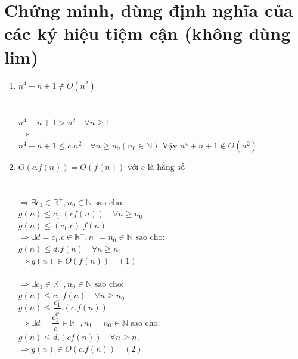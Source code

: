 \documentclass[12pt, letterpaper]{article}
\begin{document}
\section{Chứng minh, dùng định nghĩa của các ký hiệu tiệm cận (không dùng lim)}
\begin{enumerate}[label=\bfseries\large\alph*.]
    \item $n^4 + n + 1 \notin O(n^2)$ \\ \\
     \\
    $n^4 + n + 1 > n^2 \quad \forall n \geq 1$ \\
    $\Rightarrow$  \\
    $n^4 + n + 1 \leq c.n^2 \quad \forall n \geq n_0 (n_0 \in \mathbb{N})$
    $\text{Vậy } n^4 + n + 1 \notin O(n^2)$

    \item $O(c.f(n)) = O(f(n)) \text{ với c là hằng số}$ \\ \\
     \\
    $\Rightarrow \exists c_1 \in \mathbb{R^+}, n_0 \in \mathbb{N} \text{ sao cho:}$ \\
    $g(n) \leq c_1.(cf(n)) \quad \forall n \geq n_0$ \\
    $g(n) \leq (c_1.c).f(n)$ \\
    $\Rightarrow \exists d = c_1.c \in \mathbb{R^+},n_1 = n_0 \in \mathbb{N} \text{ sao cho:}$ \\
    $g(n) \leq d.f(n) \quad \forall n \geq n_1$ \\
    $\Rightarrow g(n) \in O(f(n)) \quad (1)$ \\

     \\
    $\Rightarrow \exists c_1 \in \mathbb{R^+}, n_0 \in \mathbb{N} \text{ sao cho:}$ \\
    $g(n) \leq c_1.f(n) \quad \forall n \geq n_0$ \\
    $g(n) \leq \dfrac{c_1}{c}.(c.f(n))$ \\
    $\Rightarrow \exists d = \dfrac{c_1}{c} \in \mathbb{R^+},n_1 = n_0 \in \mathbb{N} \text{ sao cho:}$ \\
    $g(n) \leq d.(cf(n)) \quad \forall n \geq n_1$ \\
    $\Rightarrow g(n) \in O(c.f(n)) \quad (2)$ \\


\end{enumerate}
\end{document}
